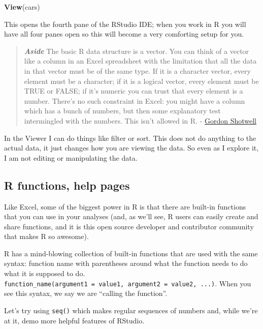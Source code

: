 \documentclass[]{book}
\newenvironment{Shaded}{\begin{snugshade}}{\end{snugshade}}
\newcommand{\KeywordTok}[1]{\textcolor[rgb]{0.13,0.29,0.53}{\textbf{#1}}}
\newcommand{\NormalTok}[1]{#1}
\begin{document}
\begin{Shaded}
\begin{Highlighting}[]
\KeywordTok{View}\NormalTok{(cars)}
\end{Highlighting}
\end{Shaded}

This opens the fourth pane of the RStudio IDE; when you work in R you will have all four panes open so this will become a very comforting setup for you.

\begin{quote}
\textbf{\emph{Aside}} The basic R data structure is a vector. You can think of a vector like a column in an Excel spreadsheet with the limitation that all the data in that vector must be of the same type. If it is a character vector, every element must be a character; if it is a logical vector, every element must be TRUE or FALSE; if it's numeric you can trust that every element is a number. There's no such constraint in Excel: you might have a column which has a bunch of numbers, but then some explanatory test intermingled with the numbers. This isn't allowed in R. - \href{https://blog.shotwell.ca/posts/r_for_excel_users/}{Gordon Shotwell}
\end{quote}

In the Viewer I can do things like filter or sort. This does not do anything to the actual data, it just changes how you are viewing the data. So even as I explore it, I am not editing or manipulating the data.

\hypertarget{r-functions-help-pages}{%
\subsection{R functions, help pages}\label{r-functions-help-pages}}

Like Excel, some of the biggest power in R is that there are built-in functions that you can use in your analyses (and, as we'll see, R users can easily create and share functions, and it is this open source developer and contributor community that makes R so awesome).

R has a mind-blowing collection of built-in functions that are used with the same syntax: function name with parentheses around what the function needs to do what it is supposed to do. \texttt{function\_name(argument1\ =\ value1,\ argument2\ =\ value2,\ ...)}. When you see this syntax, we say we are ``calling the function''.

Let's try using \texttt{seq()} which makes regular sequences of numbers and, while we're at it, demo more helpful features of RStudio.
\end{document}
